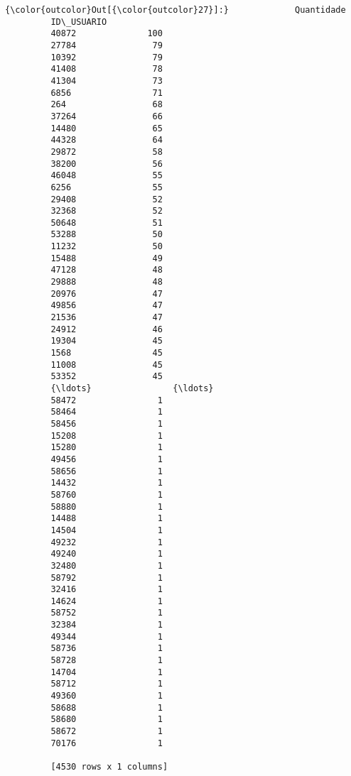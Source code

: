 \documentclass[11pt]{article}
\begin{document}
\begin{Verbatim}[commandchars=\\\{\}]
{\color{outcolor}Out[{\color{outcolor}27}]:}             Quantidade
         ID\_USUARIO            
         40872              100
         27784               79
         10392               79
         41408               78
         41304               73
         6856                71
         264                 68
         37264               66
         14480               65
         44328               64
         29872               58
         38200               56
         46048               55
         6256                55
         29408               52
         32368               52
         50648               51
         53288               50
         11232               50
         15488               49
         47128               48
         29888               48
         20976               47
         49856               47
         21536               47
         24912               46
         19304               45
         1568                45
         11008               45
         53352               45
         {\ldots}                {\ldots}
         58472                1
         58464                1
         58456                1
         15208                1
         15280                1
         49456                1
         58656                1
         14432                1
         58760                1
         58880                1
         14488                1
         14504                1
         49232                1
         49240                1
         32480                1
         58792                1
         32416                1
         14624                1
         58752                1
         32384                1
         49344                1
         58736                1
         58728                1
         14704                1
         58712                1
         49360                1
         58688                1
         58680                1
         58672                1
         70176                1
         
         [4530 rows x 1 columns]
\end{Verbatim}
            
\end{document}
